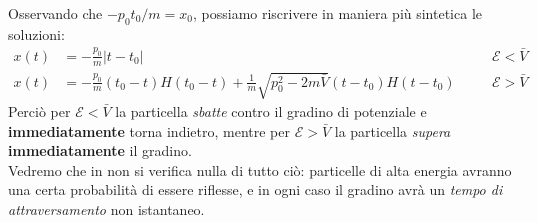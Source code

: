 \documentclass[../../FisicaTeorica.tex]{subfiles}
\begin{document}
Osservando che $-p_0 t_0 /m = x_0$, possiamo riscrivere in maniera più sintetica le soluzioni:
\begin{align*}
x(t) &= -\frac{p_0}{m}|t-t_0| && \mathcal{E}<\bar{V}\\
x(t)&=-\frac{p_0}{m}(t_0-t)H(t_0-t)+\frac{1}{m}\sqrt{p_0^2-2m\bar{V}}(t-t_0)H(t-t_0)\quad &&\mathcal{E}>\bar{V}
\end{align*}
Perciò per $\mathcal{E}<\bar{V}$ la particella \textit{sbatte} contro il gradino di potenziale e \textbf{immediatamente} torna indietro, mentre per $\mathcal{E}>\bar{V}$ la particella \textit{supera} \textbf{immediatamente} il gradino.\\
Vedremo che in \MQ non si verifica nulla di tutto ciò: particelle di alta energia avranno una certa probabilità di essere riflesse, e in ogni caso il gradino avrà un \textit{tempo di attraversamento} non istantaneo.
\end{document}
